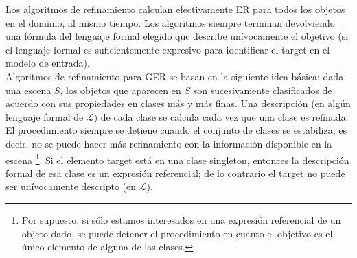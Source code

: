 Los algoritmos de refinamiento
calculan efectivamente ER para todos los objetos en el dominio, al mismo
tiempo. Los algoritmos siempre terminan devolviendo una f\'ormula del
lenguaje formal elegido que describe un\'{i}vocamente el objetivo (si el
lenguaje formal es suficientemente expresivo para identificar el target en el
modelo de entrada).\\


Algoritmos de refinamiento para GER se basan en la siguiente idea b\'asica:
dada una escena $S$, los objetos que aparecen en $S$ son sucesivamente
clasificados de acuerdo con sus propiedades en clases m\'as y m\'as finas. 
Una descripci\'on (en alg\'un lenguaje formal de $\mathcal{L}$) de cada
clase se calcula cada vez que una clase es refinada. El procedimiento siempre
se detiene cuando el conjunto de clases se estabiliza, es decir, no se puede hacer m\'as refinamiento
con la informaci\'on disponible en la escena \footnote{Por supuesto, si s\'olo estamos interesados en una expresi\'on referencial de un objeto dado, se puede detener el procedimiento en cuanto el objetivo es el
   \'unico elemento de alguna de las clases.}. Si el elemento target est\'a en
una clase singleton, entonces la descripci\'on formal de esa clase es un
expresi\'on referencial; de lo contrario el target no puede ser un\'{i}vocamente
descripto (en $\mathcal{L}$).\\


